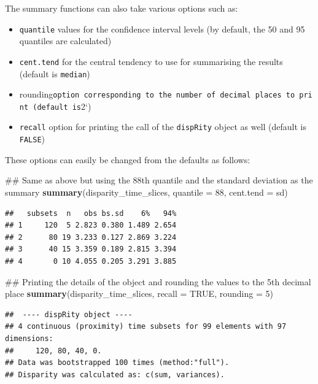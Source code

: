 \documentclass[]{book}
\newenvironment{Shaded}{\begin{snugshade}}{\end{snugshade}}
\newcommand{\KeywordTok}[1]{\textcolor[rgb]{0.13,0.29,0.53}{\textbf{#1}}}
\newcommand{\DataTypeTok}[1]{\textcolor[rgb]{0.13,0.29,0.53}{#1}}
\newcommand{\DecValTok}[1]{\textcolor[rgb]{0.00,0.00,0.81}{#1}}
\newcommand{\OtherTok}[1]{\textcolor[rgb]{0.56,0.35,0.01}{#1}}
\newcommand{\NormalTok}[1]{#1}
\providecommand{\tightlist}{%
  \setlength{\itemsep}{0pt}\setlength{\parskip}{0pt}}
\theoremstyle{definition}
\theoremstyle{definition}
\theoremstyle{remark}
\begin{document}
The summary functions can also take various options such as:

\begin{itemize}
\tightlist
\item
  \texttt{quantile} values for the confidence interval levels (by
  default, the 50 and 95 quantiles are calculated)
\item
  \texttt{cent.tend} for the central tendency to use for summarising the
  results (default is \texttt{median})
\item
  rounding\texttt{option\ corresponding\ to\ the\ number\ of\ decimal\ places\ to\ print\ (default\ is}2`)
\item
  \texttt{recall} option for printing the call of the \texttt{dispRity}
  object as well (default is \texttt{FALSE})
\end{itemize}

These options can easily be changed from the defaults as follows:

\begin{Shaded}
\begin{Highlighting}[]
\NormalTok{## Same as above but using the 88th quantile and the standard deviation as the summary }
\KeywordTok{summary}\NormalTok{(disparity_time_slices, }\DataTypeTok{quantile =} \DecValTok{88}\NormalTok{, }\DataTypeTok{cent.tend =}\NormalTok{ sd)}
\end{Highlighting}
\end{Shaded}

\begin{verbatim}
##   subsets  n   obs bs.sd    6%   94%
## 1     120  5 2.823 0.380 1.489 2.654
## 2      80 19 3.233 0.127 2.869 3.224
## 3      40 15 3.359 0.189 2.815 3.394
## 4       0 10 4.055 0.205 3.291 3.885
\end{verbatim}

\begin{Shaded}
\begin{Highlighting}[]
\NormalTok{## Printing the details of the object and rounding the values to the 5th decimal place}
\KeywordTok{summary}\NormalTok{(disparity_time_slices, }\DataTypeTok{recall =} \OtherTok{TRUE}\NormalTok{, }\DataTypeTok{rounding =} \DecValTok{5}\NormalTok{)}
\end{Highlighting}
\end{Shaded}

\begin{verbatim}
##  ---- dispRity object ---- 
## 4 continuous (proximity) time subsets for 99 elements with 97 dimensions:
##     120, 80, 40, 0.
## Data was bootstrapped 100 times (method:"full").
## Disparity was calculated as: c(sum, variances).
\end{verbatim}
\end{document}
